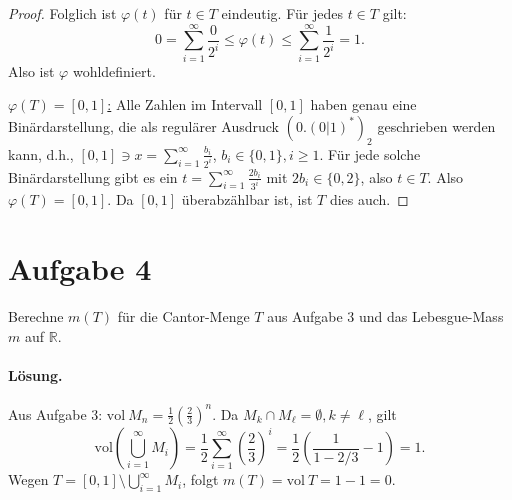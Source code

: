\documentclass[10pt]{article}\usepackage[]{graphicx}\usepackage[]{color}
\newcommand{\R}{\mathbb{R}}
\begin{document}
\begin{enumerate}[(a)]
\begin{proof}
  Folglich ist $\varphi(t)$ für $t \in T$ eindeutig.
  Für jedes $t \in T$ gilt:
  \[
  0 = \sum_{i = 1}^{\infty}\frac{0}{2^i} \leq \varphi(t) \leq \sum_{i = 1}^{\infty}\frac{1}{2^i} = 1.
  \]
  Also ist $\varphi$ wohldefiniert.

  \uline{$\varphi(T) = [0,1]$:}
  Alle Zahlen im Intervall $[0,1]$
  haben genau eine Binärdarstellung, die als regulärer Ausdruck $(0.(0|1)^*)_2$
  geschrieben werden kann,
  d.h., $[0,1] \ni x = \sum_{i=1}^{\infty}\frac{b_i}{2^i}$,
  $b_i \in \{0,1\}, i \geq 1$.
  Für jede solche Binärdarstellung gibt es
  ein $t = \sum_{i=1}^{\infty}\frac{2b_i}{3^i}$
  mit $2b_i \in \{0, 2\}$, also $t \in T$.
  Also $\varphi(T) = [0,1]$.
  Da $[0,1]$ überabzählbar ist, ist $T$ dies auch.
  \end{proof}
\end{enumerate}

\section*{Aufgabe 4}
Berechne $m(T)$ für die Cantor-Menge $T$ aus Aufgabe 3
und das Lebesgue-Mass $m$ auf $\R$.

\paragraph{Lösung.}
Aus Aufgabe 3:
$\textrm{vol}~M_n = \frac{1}{2} \left(\frac{2}{3}\right)^n$.
Da $M_k \cap M_{\ell} = \emptyset, k \neq \ell$, gilt
\[
  \textrm{vol}\left(\bigcup_{i = 1}^{\infty} M_i\right) = \frac{1}{2}\sum_{i = 1}^{\infty} \left(\frac{2}{3}\right)^i = \frac{1}{2} \left(\frac{1}{1-2/3} - 1\right) = 1.
\]
Wegen $T = [0,1] \setminus \bigcup_{i = 1}^{\infty} M_i$, folgt
$m(T) = \textrm{vol}~T = 1 - 1 = 0$.
\end{document}
